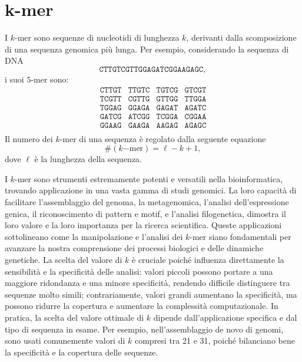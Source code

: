 \section{k-mer}
\label{sec:kmer}

I $k$-mer sono sequenze di nucleotidi di lunghezza $k$, derivanti dalla scomposizione di una sequenza genomica più lunga. Per esempio, considerando la sequenza di DNA \[ \mathtt{CTTGTCGTTGGAGATCGGAAGAGC}, \] i suoi $5$-mer sono: \[ \begin{matrix}
	\texttt{CTTGT} & \texttt{TTGTC} & \texttt{TGTCG} & \texttt{GTCGT} \\
	\texttt{TCGTT} & \texttt{CGTTG} & \texttt{GTTGG} & \texttt{TTGGA} \\
	\texttt{TGGAG} & \texttt{GGAGA} & \texttt{GAGAT} & \texttt{AGATC} \\
	\texttt{GATCG} & \texttt{ATCGG} & \texttt{TCGGA} & \texttt{CGGAA} \\
	\texttt{GGAAG} & \texttt{GAAGA} & \texttt{AAGAG} & \texttt{AGAGC} \\
\end{matrix} \]
Il numero dei $k$-mer di una sequenza è regolato dalla seguente equazione \[ \#(k\mathrm{-mer}) = \ell - k + 1, \] dove $\ell$ è la lunghezza della sequenza.

I $k$-mer sono strumenti estremamente potenti e versatili nella bioinformatica, trovando applicazione in una vasta gamma di studi genomici. La loro capacità di facilitare l'assemblaggio del genoma, la metagenomica, l'analisi dell'espressione genica, il riconoscimento di pattern e motif, e l'analisi filogenetica, dimostra il loro valore e la loro importanza per la ricerca scientifica. Queste applicazioni sottolineano come la manipolazione e l'analisi dei $k$-mer siano fondamentali per avanzare la nostra comprensione dei processi biologici e delle dinamiche genetiche. La scelta del valore di $k$ è cruciale poiché influenza direttamente la sensibilità e la specificità delle analisi: valori piccoli possono portare a una maggiore ridondanza e una minore specificità, rendendo difficile distinguere tra sequenze molto simili; contrariamente, valori grandi aumentano la specificità, ma possono ridurre la copertura e aumentare la complessità computazionale. In pratica, la scelta del valore ottimale di $k$ dipende dall'applicazione specifica e dal tipo di sequenza in esame. Per esempio, nell'assemblaggio de novo di genomi, sono usati comunemente valori di $k$ compresi tra 21 e 31, poiché bilanciano bene la specificità e la copertura delle sequenze.




